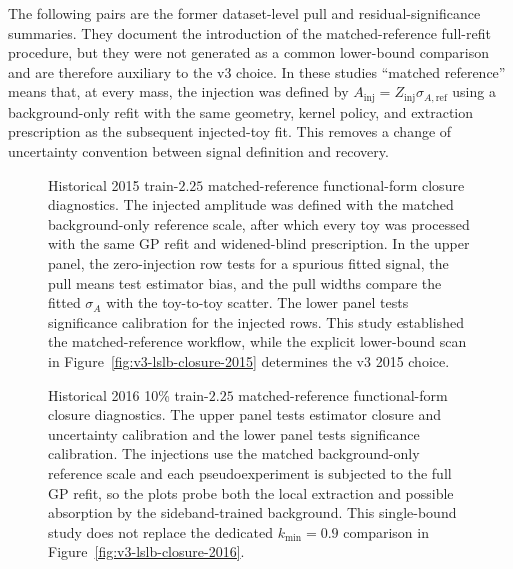 The following pairs are the former dataset-level pull and residual-significance
summaries. They document the introduction of the matched-reference full-refit
procedure, but they were not generated as a common lower-bound comparison and are
therefore auxiliary to the v3 choice. In these studies ``matched reference'' means
that, at every mass, the injection was defined by
$A_{\mathrm{inj}}=Z_{\mathrm{inj}}\sigma_{A,\mathrm{ref}}$ using a background-only
refit with the same geometry, kernel policy, and extraction prescription as the
subsequent injected-toy fit. This removes a change of uncertainty convention between
signal definition and recovery.

\begin{figure}[p]
\centering
{}

\vspace{0.35em}

\caption{Historical 2015 train-$2.25$ matched-reference functional-form closure
diagnostics. The injected amplitude was defined with the matched background-only
reference scale, after which every toy was processed with the same GP refit and
widened-blind prescription. In the upper panel, the zero-injection row tests for a
spurious fitted signal, the pull means test estimator bias, and the pull widths compare
the fitted $\sigma_A$ with the toy-to-toy scatter. The lower panel tests significance
calibration for the injected rows. This study established the matched-reference
workflow, while the explicit lower-bound scan in
Figure~\ref{fig:v3-lslb-closure-2015} determines the v3 2015 choice.}
\label{fig:refmatched-train225-closure-2015}
\end{figure}

\begin{figure}[p]
\centering
{}

\vspace{0.35em}

\caption{Historical 2016 10\% train-$2.25$ matched-reference functional-form closure
diagnostics. The upper panel tests estimator closure and uncertainty calibration and
the lower panel tests significance calibration. The injections use the matched
background-only reference scale and each pseudoexperiment is subjected to the full GP
refit, so the plots probe both the local extraction and possible absorption by the
sideband-trained background. This single-bound study does not replace the dedicated
$k_{\min}=0.9$ comparison in Figure~\ref{fig:v3-lslb-closure-2016}.}
\label{fig:refmatched-train225-closure-2016}
\end{figure}

